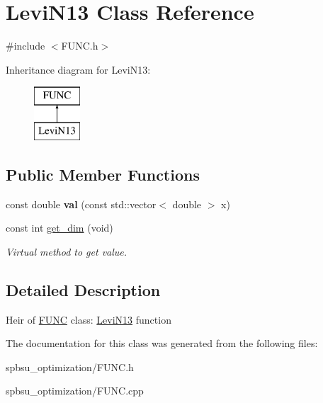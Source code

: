 \hypertarget{class_levi_n13}{}\section{Levi\+N13 Class Reference}
\label{class_levi_n13}


{\ttfamily \#include $<$F\+U\+N\+C.\+h$>$}

Inheritance diagram for Levi\+N13\+:\begin{figure}[H]
\begin{center}
\leavevmode
\includegraphics[height=2.000000cm]{class_levi_n13}
\end{center}
\end{figure}
\subsection*{Public Member Functions}
\begin{DoxyCompactItemize}
\item 
\mbox{\label{class_levi_n13_ab9abc7db5cfd35367fd60e5abad2fed8}} 
const double {\bfseries val} (const std\+::vector$<$ double $>$ x)
\item 
\mbox{\label{class_levi_n13_aaab8c7247ab648e9aed6f535747e8995}} 
const int \hyperlink{class_levi_n13_aaab8c7247ab648e9aed6f535747e8995}{get\+\_\+dim} (void)
\begin{DoxyCompactList}\small\item\em Virtual method to get value. \end{DoxyCompactList}\end{DoxyCompactItemize}


\subsection{Detailed Description}
Heir of \hyperlink{class_f_u_n_c}{F\+U\+NC} class\+: \hyperlink{class_levi_n13}{Levi\+N13} function 

The documentation for this class was generated from the following files\+:\begin{DoxyCompactItemize}
\item 
spbsu\+\_\+optimization/F\+U\+N\+C.\+h\item 
spbsu\+\_\+optimization/F\+U\+N\+C.\+cpp\end{DoxyCompactItemize}
